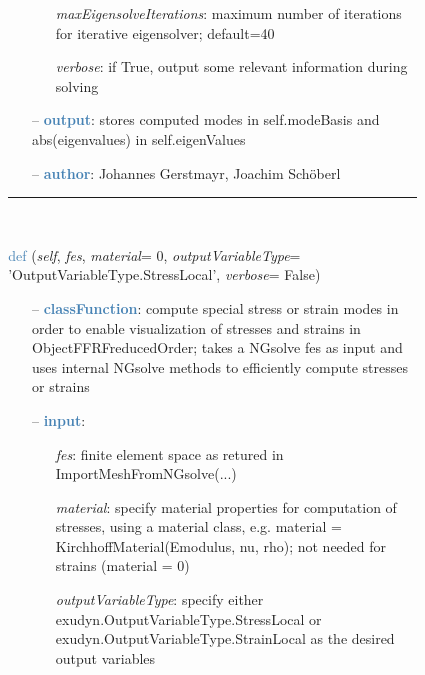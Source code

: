 \begin{itemize}[leftmargin=1.4cm]
\begin{itemize}[leftmargin=0.5cm]
\begin{itemize}[leftmargin=1.4cm]
\begin{itemize}[leftmargin=0.5cm]
\begin{itemize}[leftmargin=0.7cm]
\begin{itemize}[leftmargin=1.2cm]
    \item[] {\it   maxEigensolveIterations}: maximum number of iterations for iterative eigensolver; default=40
    \item[] {\it   verbose}: if True, output some relevant information during solving
  \end{itemize}
  \item[--]  \textcolor{steelblue}{\bf output}: stores computed modes in self.modeBasis and abs(eigenvalues) in self.eigenValues  \item[--]  \textcolor{steelblue}{\bf author}: Johannes Gerstmayr, Joachim Sch\"oberl\vspace{12pt}\end{itemize}
%
\noindent\rule{8cm}{0.75pt}\vspace{1pt} \\ 
\begin{flushleft}
\noindent \textcolor{steelblue}{def {\bf {}}}\label{sec:FEM:FEMinterface:ComputePostProcessingModesNGsolve}
({\it self}, {\it fes}, {\it material}= 0, {\it outputVariableType}= 'OutputVariableType.StressLocal', {\it verbose}= False)
\end{flushleft}
\setlength{\itemindent}{0.7cm}
\begin{itemize}[leftmargin=0.7cm]
  \item[--]  \textcolor{steelblue}{\bf classFunction}: compute special stress or strain modes in order to enable visualization of stresses and strains in ObjectFFRFreducedOrder; takes a NGsolve fes as input and uses internal NGsolve methods to efficiently compute stresses or strains  \item[--]  \textcolor{steelblue}{\bf input}: \vspace{-6pt}
  \begin{itemize}[leftmargin=1.2cm]
\setlength{\itemindent}{-0.7cm}
    \item[] {\it fes}: finite element space as retured in ImportMeshFromNGsolve(...)
    \item[] {\it   material}: specify material properties for computation of stresses, using a material class, e.g. material = KirchhoffMaterial(Emodulus, nu, rho); not needed for strains (material = 0)
    \item[] {\it   outputVariableType}: specify either exudyn.OutputVariableType.StressLocal or exudyn.OutputVariableType.StrainLocal as the desired output variables
  \end{itemize}

\end{itemize}
\end{itemize}
\end{itemize}
\end{itemize}
\end{itemize}
